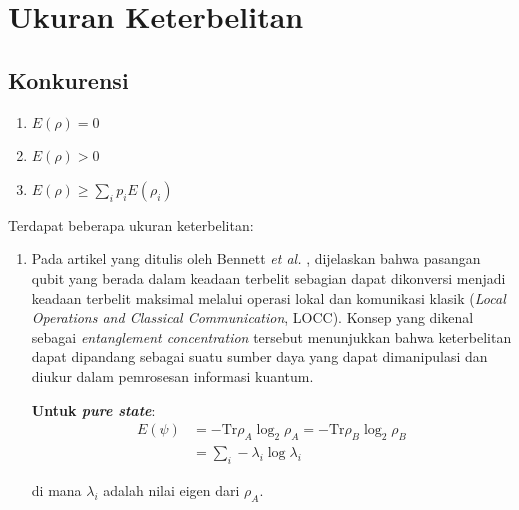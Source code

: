 \chapter{Ukuran Keterbelitan}
\section{Konkurensi}
\begin{enumerate}
	\item $E(\rho)=0$
	\item $E(\rho)>0$
	\item $E(\rho)\geq\sum_{i}p_iE(\rho_i)$
\end{enumerate}

Terdapat beberapa ukuran keterbelitan:
\begin{enumerate}
	\item Pada artikel yang ditulis oleh Bennett \textit{et al.} \cite{Bennett1996}, dijelaskan bahwa pasangan qubit yang berada dalam keadaan terbelit sebagian dapat dikonversi menjadi keadaan terbelit maksimal melalui operasi lokal dan komunikasi klasik (\textit{Local Operations and Classical Communication}, LOCC). Konsep yang dikenal sebagai \textit{entanglement concentration} tersebut menunjukkan bahwa keterbelitan dapat dipandang sebagai suatu sumber daya yang dapat dimanipulasi dan diukur dalam pemrosesan informasi kuantum.
	
	\textbf{Untuk \textit{pure state}}:
	\begin{equation}
		\begin{aligned}
			E(\psi)
			&=-\mathrm{Tr}\rho_{A}\log_2\rho_{A}=-\mathrm{Tr}\rho_{B}\log_2\rho_{B}\\
			&=\sum_{i}-\lambda_i\log\lambda_i
		\end{aligned}
	\end{equation}
	
	di mana $\lambda_i$ adalah nilai eigen dari $\rho_{A}$.
	

\end{enumerate}
